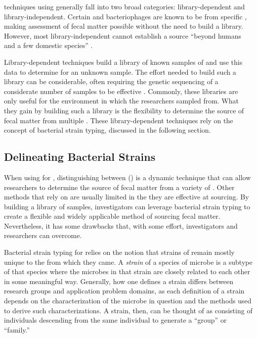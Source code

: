 \mst{} techniques using \fib{} generally fall into two broad categories: library-dependent and library-independent.
Certain \fib{} and bacteriophages are known to be from specific \spec{}, making \spec{} assessment of fecal matter possible without the need to build a library.
However, most library-independent \mst{} cannot establish a \spec{} source ``beyond humans and a few domestic species'' \cite{rogers2005detecting}.

Library-dependent techniques build a library of known \spec{} samples of \fib{} and use this data to determine \spec{} for an unknown sample.
The effort needed to build such a library can be considerable, often requiring the genetic sequencing of a considerate number of samples to be effective \cite{rogers2005detecting}.
Commonly, these libraries are only useful for the environment in which the researchers sampled from.
What they gain by building such a library is the flexibility to determine the source of fecal matter from multiple \spec{} \cite{rogers2005detecting}.
These library-dependent techniques rely on the concept of bacterial strain typing, discussed in the following section.


\subsection{Delineating Bacterial Strains}
When using \fib{} for \mst{}, distinguishing between \bslongs{} (\bs{}) is a dynamic technique that can allow researchers to determine the source of fecal matter from a variety of \spec{}.
Other methods that rely on \mst{} are usually limited in the \spec{} they are effective at sourcing.
By building a library of \fib{} samples, investigators can leverage bacterial strain typing to create a flexible and widely applicable method of sourcing fecal matter.
Nevertheless, it has some drawbacks that, with some effort, \mst{} investigators and researchers can overcome.

Bacterial strain typing for \mst{} relies on the notion that strains of \fib{} remain mostly unique to the \spec{} from which they came.
A \textit{strain} of a species of microbe is a subtype of that species where the microbes in that strain are closely related to each other in some meaningful way. 
Generally, how one defines a strain differs between research groups and application problem domains, as each definition of a strain depends on the characterization of the microbe in question and the methods used to derive such characterizations.
A strain, then, can be thought of as consisting of individuals descending from the same individual to generate a ``group'' or ``family.''

